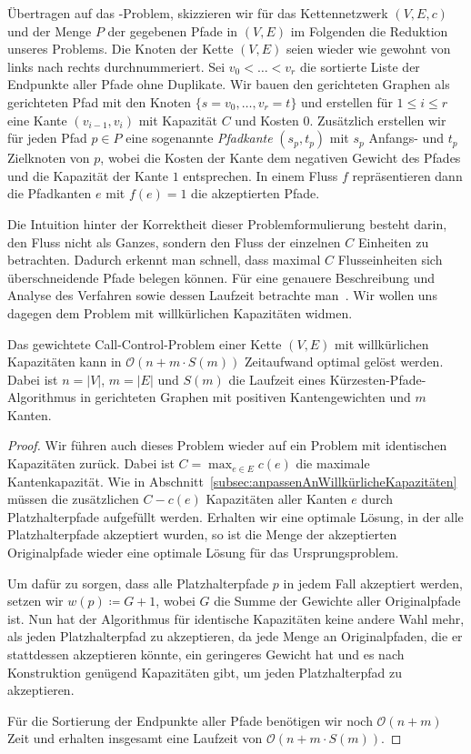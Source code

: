 Übertragen auf das \WeightedCallControl-Problem, skizzieren wir für das Kettennetzwerk $(V,E,c)$
und der Menge $P$ der gegebenen Pfade in $(V,E)$ im Folgenden die Reduktion unseres Problems.
Die Knoten der Kette $(V,E)$ seien wieder wie gewohnt von links nach rechts durchnummeriert.
Sei $v_0 < \dots < v_r$ die sortierte Liste der Endpunkte aller Pfade ohne Duplikate.
Wir bauen den gerichteten Graphen als gerichteten Pfad mit den Knoten $\{s = v_0, \dots, v_r=t\}$ und erstellen
für $1 \leq i \leq r$ eine Kante $(v_{i-1}, v_i)$ mit Kapazität $C$ und Kosten $0$.
Zusätzlich erstellen wir für jeden Pfad $p \in P$ eine sogenannte {\em Pfadkante} $(s_p, t_p)$ mit $s_p$ Anfangs- und $t_p$ Zielknoten von $p$,
wobei die Kosten der Kante dem negativen Gewicht des Pfades und die Kapazität der Kante $1$ entsprechen.
In einem Fluss $f$ repräsentieren dann die Pfadkanten $e$ mit $f(e)=1$ die akzeptierten Pfade.

Die Intuition hinter der Korrektheit dieser Problemformulierung besteht darin, den Fluss nicht als Ganzes, sondern
den Fluss der einzelnen $C$ Einheiten zu betrachten.
Dadurch erkennt man schnell, dass maximal $C$ Flusseinheiten sich überschneidende Pfade belegen können.
Für eine genauere Beschreibung und Analyse des Verfahren sowie dessen Laufzeit betrachte man~\cite{carlisle}.
Wir wollen uns dagegen dem Problem mit willkürlichen Kapazitäten widmen.

\begin{theorem}
    Das gewichtete Call-Control-Problem einer Kette $(V, E)$ mit willkürlichen Kapazitäten kann in $\mathcal O(n + m\cdot S(m))$
    Zeitaufwand optimal gelöst werden.
    Dabei ist $n = |V|$, $m=|E|$ und $S(m)$ die Laufzeit eines Kürzesten-Pfade-Algorithmus in gerichteten Graphen mit
    positiven Kantengewichten und $m$ Kanten.
\end{theorem}
\begin{proof}
    Wir führen auch dieses Problem wieder auf ein Problem mit identischen Kapazitäten zurück.
    Dabei ist $C = \max_{e \in E}c(e)$ die maximale Kantenkapazität.
    Wie in Abschnitt~\ref{subsec:anpassenAnWillkürlicheKapazitäten} müssen die zusätzlichen $C - c(e)$ Kapazitäten
    aller Kanten $e$ durch Platzhalterpfade aufgefüllt werden.
    Erhalten wir eine optimale Lösung, in der alle Platzhalterpfade akzeptiert wurden, so ist die Menge der akzeptierten
    Originalpfade wieder eine optimale Lösung für das Ursprungsproblem.

    Um dafür zu sorgen, dass alle Platzhalterpfade $p$ in jedem Fall akzeptiert werden, setzen wir
    $w(p) \coloneqq G + 1$, wobei $G$ die Summe der Gewichte aller Originalpfade ist.
    Nun hat der Algorithmus für identische Kapazitäten keine andere Wahl mehr, als jeden Platzhalterpfad zu akzeptieren,
    da jede Menge an Originalpfaden, die er stattdessen akzeptieren könnte, ein geringeres Gewicht hat und es nach
    Konstruktion genügend Kapazitäten gibt, um jeden Platzhalterpfad zu akzeptieren.

    Für die Sortierung der Endpunkte aller Pfade benötigen wir noch $\mathcal O(n+m)$ Zeit und erhalten insgesamt eine Laufzeit
    von $\mathcal O(n+m\cdot S(m))$.
\end{proof}

